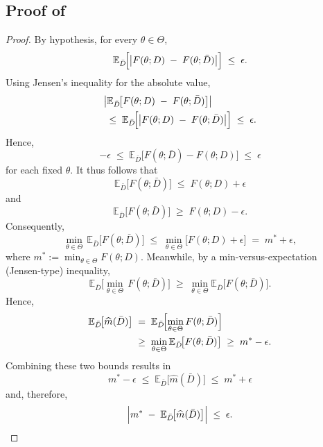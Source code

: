 \subsection{Proof of }
\label{proof:thm-expected-eps-stability}
\begin{proof}
By hypothesis, for every \(\theta\in\Theta\),
\[
  \mathbb{E}_{\bar{D}}\!\Bigl[
    \bigl\lvert F(\theta;D) \;-\; F(\theta;\bar{D})\bigr\rvert
  \Bigr]
  \;\le\;\epsilon.
\]
Using Jensen's inequality for the absolute value,
\begin{align*}
  &\bigl\lvert
    \mathbb{E}_{\bar{D}}\!\bigl[
      F(\theta;D) \;-\; F(\theta;\bar{D})
    \bigr]
  \bigr\rvert \\
  &\;\le\;
  \mathbb{E}_{\bar{D}}\!\Bigl[
    \bigl\lvert
      F(\theta;D) \;-\; F(\theta;\bar{D})
    \bigr\rvert
  \Bigr] 
  \;\le\;\epsilon.
\end{align*}
Hence,
\[
  -\epsilon 
  \;\le\;
  \mathbb{E}_{\bar{D}}\!\bigl[
    F(\theta;\bar{D}) - F(\theta;D)
  \bigr]
  \;\le\;
  \epsilon
\]
for each fixed $\theta$. It thus follows that
\[
  \mathbb{E}_{\bar{D}}\!\bigl[F(\theta;\bar{D})\bigr]
  \;\le\;
  F(\theta;D) + \epsilon
\]
and
\[
  \mathbb{E}_{\bar{D}}\!\bigl[F(\theta;\bar{D})\bigr]
  \;\ge\;
  F(\theta;D) - \epsilon.
\]
Consequently,
\[
  \min_{\theta\in\Theta}\,
  \mathbb{E}_{\bar{D}}\!\bigl[F(\theta;\bar{D})\bigr]
  \;\le\;
  \min_{\theta\in\Theta}
  \bigl[
    F(\theta;D) + \epsilon
  \bigr]
  \;=\;
  m^* + \epsilon,
\]
where \(m^* := \min_{\theta\in\Theta} F(\theta;D)\).  
Meanwhile, by a min-versus-expectation (Jensen-type) inequality,
\[
  \mathbb{E}_{\bar{D}}\!\bigl[\min_{\theta\in\Theta}\,
  F(\theta;\bar{D})\bigr]
  \;\ge\;
  \min_{\theta\in\Theta}
  \mathbb{E}_{\bar{D}}\!\bigl[
    F(\theta;\bar{D})
  \bigr].
\]
Hence,
\begin{align*}
  \mathbb{E}_{\bar{D}}\!\bigl[\widehat{m}(\bar{D})\bigr]
  &\;=\;
  \mathbb{E}_{\bar{D}}\!\Bigl[\min_{\theta\in\Theta}
    F(\theta;\bar{D})
  \Bigr]
  \\ 
  &\;\ge\; 
  \min_{\theta\in\Theta}
  \mathbb{E}_{\bar{D}}\!\bigl[
    F(\theta;\bar{D})
  \bigr]
  \;\ge\;
  m^* - \epsilon.
\end{align*}
Combining these two bounds results in
\[
  m^* - \epsilon
  \;\le\;
  \mathbb{E}_{\bar{D}}\!\bigl[\widehat{m}(\bar{D})\bigr]
  \;\le\;
  m^* + \epsilon
\]
and, therefore,
\[
\Bigl|
    m^*
    \;-\;
    \mathbb{E}_{\bar{D}}\!\bigl[\widehat{m}(\bar{D})\bigr]
  \Bigr|
  \;\le\;\epsilon.
\]
\end{proof}


